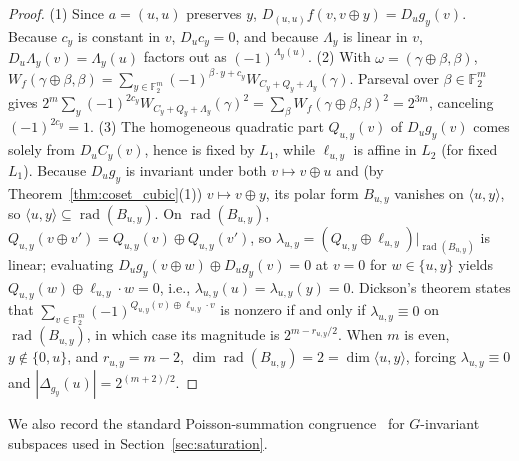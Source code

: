 \documentclass[11pt,a4paper]{article}
\theoremstyle{definition}
\newcommand{\F}{\mathbb{F}_2}
\newcommand{\rad}{\operatorname{rad}}
\begin{document}
\begin{proof}
(1) Since $a = (u,u)$ preserves $y$, $D_{(u,u)} f(v,v \oplus y) = D_u g_y(v)$. Because $c_y$ is constant in $v$, $D_u c_y = 0$, and because $\Lambda_y$ is linear in $v$, $D_u \Lambda_y(v) = \Lambda_y(u)$ factors out as $(-1)^{\Lambda_y(u)}$.
(2) With $\omega = (\gamma \oplus \beta, \beta)$, $W_f(\gamma \oplus \beta, \beta) = \sum_{y \in \F^m} (-1)^{\beta \cdot y + c_y} W_{C_y + Q_y + \Lambda_y}(\gamma)$. Parseval over $\beta \in \F^m$ gives $2^m \sum_y (-1)^{2 c_y} W_{C_y + Q_y + \Lambda_y}(\gamma)^2 = \sum_\beta W_f(\gamma \oplus \beta, \beta)^2 = 2^{3m}$, canceling $(-1)^{2c_y}=1$.
(3) The homogeneous quadratic part $Q_{u,y}(v)$ of $D_u g_y(v)$ comes solely from $D_u C_y(v)$, hence is fixed by $L_1$, while $\ell_{u,y}$ is affine in $L_2$ (for fixed $L_1$). Because $D_u g_y$ is invariant under both $v \mapsto v \oplus u$ and (by Theorem~\ref{thm:coset_cubic}(1)) $v \mapsto v \oplus y$, its polar form $B_{u,y}$ vanishes on $\langle u, y \rangle$, so $\langle u, y \rangle \subseteq \rad(B_{u,y})$. On $\rad(B_{u,y})$, $Q_{u,y}(v \oplus v') = Q_{u,y}(v) \oplus Q_{u,y}(v')$, so $\lambda_{u,y} = (Q_{u,y} \oplus \ell_{u,y})|_{\rad(B_{u,y})}$ is linear; evaluating $D_u g_y(v \oplus w) \oplus D_u g_y(v) = 0$ at $v=0$ for $w \in \{u, y\}$ yields $Q_{u,y}(w) \oplus \ell_{u,y} \cdot w = 0$, i.e., $\lambda_{u,y}(u) = \lambda_{u,y}(y) = 0$. Dickson's theorem states that $\sum_{v \in \F^m} (-1)^{Q_{u,y}(v) \oplus \ell_{u,y} \cdot v}$ is nonzero if and only if $\lambda_{u,y} \equiv 0$ on $\rad(B_{u,y})$, in which case its magnitude is $2^{m - r_{u,y}/2}$. When $m$ is even, $y \notin \{0,u\}$, and $r_{u,y} = m-2$, $\dim \rad(B_{u,y}) = 2 = \dim\langle u,y\rangle$, forcing $\lambda_{u,y} \equiv 0$ and $|\Delta_{g_y}(u)| = 2^{(m+2)/2}$.
\end{proof}

We also record the standard Poisson-summation congruence~\cite{carlet_book} for $G$-invariant subspaces used in Section~\ref{sec:saturation}.
\end{document}
